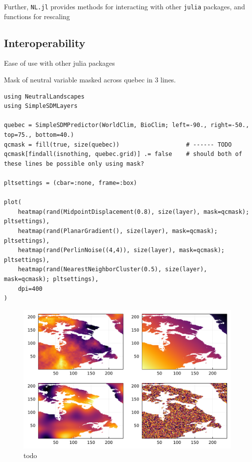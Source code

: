 \documentclass[11pt]{article}
\makeatletter
\def\maxwidth{\ifdim\Gin@nat@width>\linewidth\linewidth
\else\Gin@nat@width\fi}
\let\Oldincludegraphics\includegraphics
\renewcommand{\includegraphics}[1]{\Oldincludegraphics[width=\maxwidth]{#1}}
\makeatother
\begin{document}
Further, \texttt{NL.jl} provides methods for interacting with other
\texttt{julia} packages, and functions for rescaling

\hypertarget{interoperability}{%
\subsection{Interoperability}\label{interoperability}}

Ease of use with other julia packages

Mask of neutral variable masked across quebec in 3 lines.

\begin{verbatim}
using NeutralLandscapes
using SimpleSDMLayers

quebec = SimpleSDMPredictor(WorldClim, BioClim; left=-90., right=-50., top=75., bottom=40.)
qcmask = fill(true, size(quebec))                   # ------ TODO
qcmask[findall(isnothing, quebec.grid)] .= false    # should both of these lines be possible only using mask?

pltsettings = (cbar=:none, frame=:box)

plot(
    heatmap(rand(MidpointDisplacement(0.8), size(layer), mask=qcmask); pltsettings),
    heatmap(rand(PlanarGradient(), size(layer), mask=qcmask); pltsettings),
    heatmap(rand(PerlinNoise((4,4)), size(layer), mask=qcmask); pltsettings),
    heatmap(rand(NearestNeighborCluster(0.5), size(layer), mask=qcmask); pltsettings),
    dpi=400
)
\end{verbatim}

\begin{figure}
\centering
\includegraphics{./figures/interoperable.png}
\caption{todo}
\end{figure}
\end{document}
